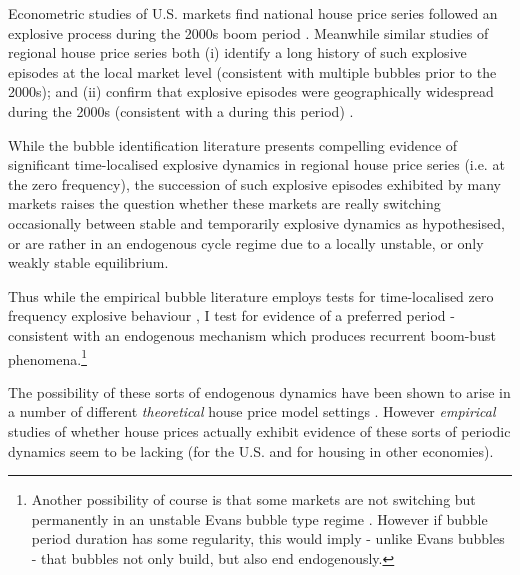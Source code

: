 \documentclass[11pt]{article}
\begin{document}
Econometric studies of U.S. markets find national house price series followed an explosive process during the 2000s boom period %
\citep{Kivedal2013,Phillips2011a,Zhou2005,Bolt2014}. %
Meanwhile similar studies of regional house price series both (i) identify a long history of such explosive episodes at the local market level (consistent with multiple  bubbles prior to the 2000s); and (ii) confirm that explosive episodes were geographically widespread during the 2000s (consistent with a  during this period) \citep{Shi2017,Hu2018,Pavlidis2018}.

While the bubble identification literature presents compelling evidence of significant time-localised explosive dynamics in regional house price series (i.e. at the zero frequency), the succession of such explosive episodes exhibited by many markets raises the question whether these markets are really switching occasionally between stable and temporarily explosive dynamics as hypothesised, or are rather in an endogenous cycle regime due to a locally unstable, or only weakly stable equilibrium. 

Thus while the empirical bubble literature employs tests for time-localised zero frequency explosive behaviour \citep{Kivedal2013,Phillips2011a,Zhou2005,Bolt2014}, I test for evidence of a preferred period - consistent with an endogenous mechanism which produces recurrent
boom-bust phenomena.\footnote{Another possibility of course is that some markets are not switching but permanently in an unstable Evans bubble type regime \citep{Evans1991}. However if bubble period duration has some regularity, this would imply - unlike Evans bubbles - that bubbles not only build, but also end endogenously.}

The possibility of these sorts of endogenous dynamics have been shown to arise in a number of different \textit{theoretical} house price model settings \citep{He2015,Bolt2014,Burnside2016, Kouwenberg2015, Eichholtz2015, Dieci2012, Dieci2016,Lingling2009,Baptista2016,Geanakoplos2012,Sommervoll2010,Defusco2017, Chia2017, Diks2016}. However \textit{empirical} studies of whether house prices actually exhibit evidence of these sorts of periodic dynamics seem to be lacking (for the U.S. and for housing in other economies).%

\end{document}
